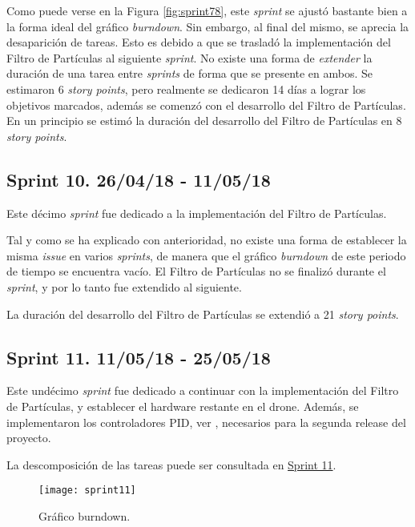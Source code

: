 Como puede verse en la Figura \ref{fig:sprint78}, este \emph{sprint} se ajustó bastante bien a la forma ideal del gráfico \emph{burndown}. Sin embargo, al final del mismo, se aprecia la desaparición de tareas. Esto es debido a que se trasladó la implementación del Filtro de Partículas al siguiente \emph{sprint}. No existe una forma de \emph{extender} la duración de una tarea entre \emph{sprints} de forma que se presente en ambos.
Se estimaron 6 \emph{story points}, pero realmente se dedicaron 14 días a lograr los objetivos marcados, además se comenzó con el desarrollo del Filtro de Partículas.
En un principio se estimó la duración del desarrollo del Filtro de Partículas en 8 \emph{story points}.

\subsection{Sprint 10. 26/04/18 - 11/05/18}

Este décimo \emph{sprint} fue dedicado a la implementación del Filtro de Partículas.

Tal y como se ha explicado con anterioridad, no existe una forma de establecer la misma \emph{issue} en varios \emph{sprints}, de manera que el gráfico \emph{burndown} de este periodo de tiempo se encuentra vacío. El Filtro de Partículas no se finalizó durante el \emph{sprint}, y por lo tanto fue extendido al siguiente.

La duración del desarrollo del Filtro de Partículas se extendió a 21 \emph{story points}.


\subsection{Sprint 11. 11/05/18 - 25/05/18}

Este undécimo \emph{sprint} fue dedicado a continuar con la implementación del Filtro de Partículas, y establecer el hardware restante en el drone.
Además, se implementaron los controladores PID, ver \citep{wiki:PID}, necesarios para la segunda release del proyecto.

La descomposición de las tareas puede ser consultada en \href{https://github.com/mbm0089/gii_0_17.02_snsi/milestone/10?closed=1}{Sprint 11}.

\begin{figure}
	\centering
	\texttt{[image: sprint11]}
	\caption[Burndown Sprint 11]{Gráfico burndown.}\label{fig:sprint11}
\end{figure}


